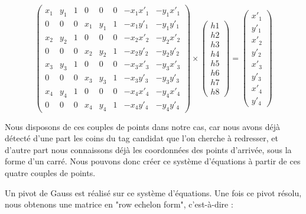         \[
        \begin{pmatrix} 
            x_1 & y_1 & 1 & 0 & 0 & 0 & -x_1 x'_1 & -y_1 x'_1 \\ 
            0 & 0 & 0 & x_1 & y_1 & 1 & -x_1 y'_1 & -y_1 y'_1 \\
    
            x_2 & y_2 & 1 & 0 & 0 & 0 & -x_2 x'_2 & -y_2 x'_2 \\ 
            0 & 0 & 0 & x_2 & y_2 & 1 & -x_2 y'_2 & -y_2 y'_2 \\
    
            x_3 & y_3 & 1 & 0 & 0 & 0 & -x_3 x'_3 & -y_3 x'_3 \\ 
            0 & 0 & 0 & x_3 & y_3 & 1 & -x_3 y'_3 & -y_3 y'_3 \\
    
            x_4 & y_4 & 1 & 0 & 0 & 0 & -x_4 x'_4 & -y_4 x'_4 \\ 
            0 & 0 & 0 & x_4 & y_4 & 1 & -x_4 y'_4 & -y_4 y'_4
        \end{pmatrix} 
        \times
        \begin{pmatrix} h1 \\ h2 \\ h3 \\ h4 \\ h5 \\h6 \\ h7 \\ h8 \end{pmatrix}
        =
        \begin{pmatrix} x'_1 \\ y'_1 \\ x'_2 \\ y'_2 \\ x'_3 \\ y'_3 \\ x'_4 \\ y'_4 \end{pmatrix} 
        \]
    
        Nous disposons de ces couples de points dans notre cas, car nous avons déjà détecté d'une part les coins du tag candidat que l'on cherche à redresser, et d'autre part nous connaissons déjà les coordonnées des points d'arrivée, sous la forme d'un carré. Nous pouvons donc créer ce système d'équations à partir de ces quatre couples de points.

        Un pivot de Gauss est réalisé sur ce système d'équations. Une fois ce pivot résolu, nous obtenons une matrice en "row echelon form", c'est-à-dire :
    
